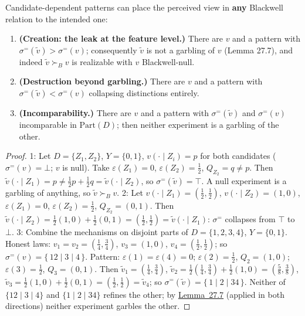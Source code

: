 
\begin{thmplain}

Candidate-dependent patterns can place the perceived view in \textbf{any} Blackwell relation to the intended one:

\begin{enumerate}
\def\labelenumi{\arabic{enumi}.}
\tightlist
\item
  \textbf{(Creation: the leak at the feature level.)} There are \(v\) and a pattern with \(\sigma^{=}(\tilde v) > \sigma^{=}(v)\); consequently \(\tilde v\) is not a garbling of \(v\) (Lemma 27.7), and indeed \(\tilde v \succ_B v\) is realizable with \(v\) Blackwell-null.
\item
  \textbf{(Destruction beyond garbling.)} There are \(v\) and a pattern with \(\sigma^{=}(\tilde v) < \sigma^{=}(v)\) collapsing distinctions entirely.
\item
  \textbf{(Incomparability.)} There are \(v\) and a pattern with \(\sigma^{=}(\tilde v)\) and \(\sigma^{=}(v)\) incomparable in \(\mathrm{Part}(D)\); then neither experiment is a garbling of the other.
\end{enumerate}
\end{thmplain}

\begin{proof}

1: Let \(D = \{Z_1, Z_2\}\), \(Y = \{0,1\}\), \(v(\cdot \mid Z_i) = p\) for both candidates (\(\sigma^=(v) = \bot\); \(v\) is null). Take \(\varepsilon(Z_1) = 0\), \(\varepsilon(Z_2) = \tfrac12\), \(Q_{Z_2} = q \ne p\). Then \(\tilde v(\cdot \mid Z_1) = p \ne \tfrac12 p + \tfrac12 q = \tilde v(\cdot \mid Z_2)\), so \(\sigma^=(\tilde v) = \top\). A null experiment is a garbling of anything, so \(\tilde v \succ_B v\).
2: Let \(v(\cdot \mid Z_1) = (\tfrac12, \tfrac12)\), \(v(\cdot \mid Z_2) = (1, 0)\), \(\varepsilon(Z_1) = 0\), \(\varepsilon(Z_2) = \tfrac12\), \(Q_{Z_2} = (0,1)\). Then \(\tilde v(\cdot \mid Z_2) = \tfrac12(1,0) + \tfrac12(0,1) = (\tfrac12, \tfrac12) = \tilde v(\cdot \mid Z_1)\): \(\sigma^=\) collapses from \(\top\) to \(\bot\).
3: Combine the mechanisms on disjoint parts of \(D = \{1,2,3,4\}\), \(Y = \{0,1\}\). Honest laws: \(v_1 = v_2 = (\tfrac14, \tfrac34)\), \(v_3 = (1,0)\), \(v_4 = (\tfrac12, \tfrac12)\); so \(\sigma^=(v) = \{\,12 \mid 3 \mid 4\,\}\). Pattern: \(\varepsilon(1) = \varepsilon(4) = 0\); \(\varepsilon(2) = \tfrac12\), \(Q_2 = (1,0)\); \(\varepsilon(3) = \tfrac12\), \(Q_3 = (0,1)\). Then \(\tilde v_1 = (\tfrac14, \tfrac34)\), \(\tilde v_2 = \tfrac12(\tfrac14,\tfrac34) + \tfrac12(1,0) = (\tfrac58, \tfrac38)\), \(\tilde v_3 = \tfrac12(1,0) + \tfrac12(0,1) = (\tfrac12,\tfrac12) = \tilde v_4\); so \(\sigma^=(\tilde v) = \{\,1 \mid 2 \mid 34\,\}\). Neither of \(\{12 \mid 3 \mid 4\}\) and \(\{1 \mid 2 \mid 34\}\) refines the other; by \hyperlink{stmt:27.7}{Lemma~27.7} (applied in both directions) neither experiment garbles the other.
\end{proof}

